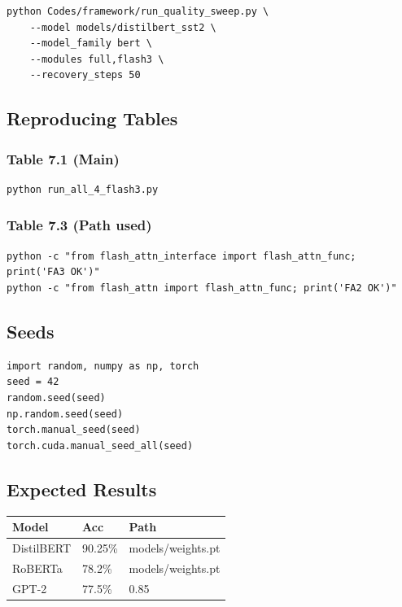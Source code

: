 \begin{lstlisting}
python Codes/framework/run_quality_sweep.py \
    --model models/distilbert_sst2 \
    --model_family bert \
    --modules full,flash3 \
    --recovery_steps 50
\end{lstlisting}

\subsection{Reproducing Tables}

\subsubsection{Table 7.1 (Main)}
\begin{lstlisting}
python run_all_4_flash3.py
\end{lstlisting}

\subsubsection{Table 7.3 (Path used)}
\begin{lstlisting}
python -c "from flash_attn_interface import flash_attn_func; print('FA3 OK')"
python -c "from flash_attn import flash_attn_func; print('FA2 OK')"
\end{lstlisting}

\subsection{Seeds}

\begin{lstlisting}
import random, numpy as np, torch
seed = 42
random.seed(seed)
np.random.seed(seed)
torch.manual_seed(seed)
torch.cuda.manual_seed_all(seed)
\end{lstlisting}

\subsection{Expected Results}

\begin{table}[H]
\centering
\small
\begin{tabular}{lll}
\toprule
\textbf{Model} & \textbf{Acc} & \textbf{Path} \\
\midrule
DistilBERT & 90.25\% & models/weights.pt \\
RoBERTa & 78.2\% & models/weights.pt \\
GPT-2 & 77.5\% & 0.85 \\
\bottomrule
\end{tabular}
\end{table}

